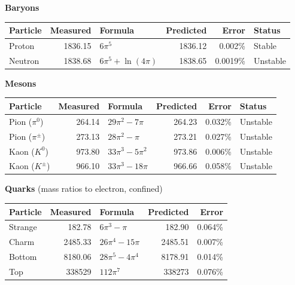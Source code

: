 \documentclass[12pt]{article}
\begin{document}
\bigskip
\textbf{Baryons}

\medskip
\begin{center}
\begin{tabular}{l r l r r l}
\toprule
\textbf{Particle} & \textbf{Measured} & \textbf{Formula} & \textbf{Predicted} & \textbf{Error} & \textbf{Status} \\
\midrule
Proton & 1836.15 & $6\pi^5$ & 1836.12 & 0.002\% & Stable \\
Neutron & 1838.68 & $6\pi^5 + \ln(4\pi)$ & 1838.65 & 0.0019\% & Unstable \\
\bottomrule
\end{tabular}
\end{center}

\bigskip
\textbf{Mesons}

\medskip
\begin{center}
\begin{tabular}{l r l r r l}
\toprule
\textbf{Particle} & \textbf{Measured} & \textbf{Formula} & \textbf{Predicted} & \textbf{Error} & \textbf{Status} \\
\midrule
Pion ($\pi^0$) & 264.14 & $29\pi^2 - 7\pi$ & 264.23 & 0.032\% & Unstable \\
Pion ($\pi^\pm$) & 273.13 & $28\pi^2 - \pi$ & 273.21 & 0.027\% & Unstable \\
Kaon ($K^0$) & 973.80 & $33\pi^3 - 5\pi^2$ & 973.86 & 0.006\% & Unstable \\
Kaon ($K^\pm$) & 966.10 & $33\pi^3 - 18\pi$ & 966.66 & 0.058\% & Unstable \\
\bottomrule
\end{tabular}
\end{center}

\bigskip
\textbf{Quarks} (mass ratios to electron, confined)

\medskip
\begin{center}
\begin{tabular}{l r l r r}
\toprule
\textbf{Particle} & \textbf{Measured} & \textbf{Formula} & \textbf{Predicted} & \textbf{Error} \\
\midrule
Strange & 182.78 & $6\pi^3 - \pi$ & 182.90 & 0.064\% \\
Charm & 2485.33 & $26\pi^4 - 15\pi$ & 2485.51 & 0.007\% \\
Bottom & 8180.06 & $28\pi^5 - 4\pi^4$ & 8178.91 & 0.014\% \\
Top & 338529 & $112\pi^7$ & 338273 & 0.076\% \\
\bottomrule
\end{tabular}
\end{center}
\end{document}
